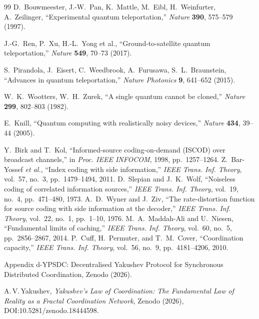 \documentclass[12pt,a4paper]{article}
\theoremstyle{remark}
\begin{document}
\begin{thebibliography}{99}
		 D.~Bouwmeester, J.-W.~Pan, K.~Mattle, M.~Eibl, H.~Weinfurter, A.~Zeilinger,
		``Experimental quantum teleportation,''
		\emph{Nature} \textbf{390}, 575--579 (1997).
		
		 J.-G.~Ren, P.~Xu, H.-L.~Yong et al.,
		``Ground-to-satellite quantum teleportation,''
		\emph{Nature} \textbf{549}, 70--73 (2017).
		
		 S.~Pirandola, J.~Eisert, C.~Weedbrook, A.~Furusawa, S.~L.~Braunstein,
		``Advances in quantum teleportation,''
		\emph{Nature Photonics} \textbf{9}, 641--652 (2015).
		
		 W.~K.~Wootters, W.~H.~Zurek,
		``A single quantum cannot be cloned,''
		\emph{Nature} \textbf{299}, 802--803 (1982).
		
		 E.~Knill,
		``Quantum computing with realistically noisy devices,''
		\emph{Nature} \textbf{434}, 39--44 (2005).
		
		 Y.~Birk and T.~Kol, ``Informed-source coding-on-demand (ISCOD) over broadcast channels,'' in \emph{Proc. IEEE INFOCOM}, 1998, pp.~1257--1264.
		 Z.~Bar-Yossef \emph{et al.}, ``Index coding with side information,'' \emph{IEEE Trans. Inf. Theory}, vol.~57, no.~3, pp.~1479--1494, 2011.
		 D.~Slepian and J.~K.~Wolf, ``Noiseless coding of correlated information sources,'' \emph{IEEE Trans. Inf. Theory}, vol.~19, no.~4, pp.~471--480, 1973.
		 A.~D.~Wyner and J.~Ziv, ``The rate-distortion function for source coding with side information at the decoder,'' \emph{IEEE Trans. Inf. Theory}, vol.~22, no.~1, pp.~1--10, 1976.
		 M.~A.~Maddah-Ali and U.~Niesen, ``Fundamental limits of caching,'' \emph{IEEE Trans. Inf. Theory}, vol.~60, no.~5, pp.~2856--2867, 2014.
		 P.~Cuff, H.~Permuter, and T.~M.~Cover, ``Coordination capacity,'' \emph{IEEE Trans. Inf. Theory}, vol.~56, no.~9, pp.~4181--4206, 2010.
		
		Appendix d-YPSDC: Decentralised Yakushev Protocol for Synchronous Distributed Coordination, Zenodo (2026).
		
		A.\,V.\,Yakushev, \emph{Yakushev's Law of Coordination: The Fundamental Law
			of Reality as a Fractal Coordination Network}, Zenodo (2026), DOI:10.5281/zenodo.18444598.
	\end{thebibliography}
	
\end{document}
